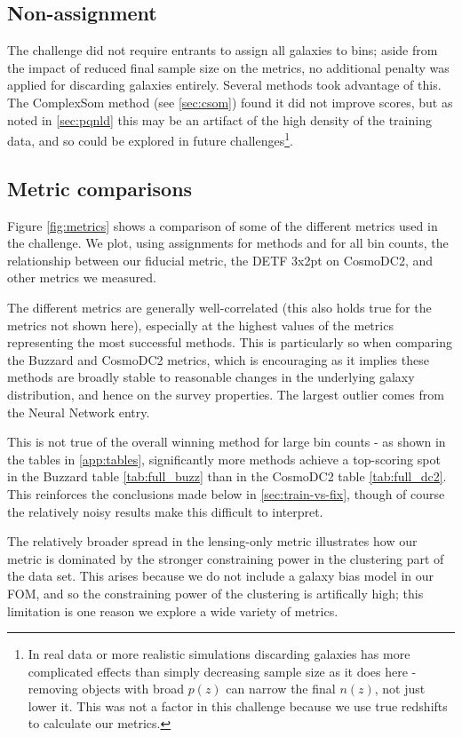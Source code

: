 \documentclass[twocolumn,twocolappendix]{aastex63}
\begin{document}
\subsection{Non-assignment}
The challenge did not require entrants to assign all galaxies to bins; aside from the impact of reduced final sample size on the metrics, no additional penalty was applied for discarding galaxies entirely.  Several methods
took advantage of this.  The ComplexSom method (see \autoref{sec:csom}) found
it did not improve scores, but as noted in \autoref{sec:pqnld} this may be an artifact
of the high density of the training data, and so could be explored in future challenges\footnote{In real data or more realistic simulations discarding galaxies has more complicated effects than simply decreasing sample size as it does here - removing objects with broad $p(z)$ can narrow the final $n(z)$, not just lower it. This was not a factor in this challenge because we use true redshifts to calculate our metrics.}.


\subsection{Metric comparisons} \label{sec:metric-results}
Figure \ref{fig:metrics} shows a comparison of some of the different metrics used in the challenge.
We plot, using assignments for methods and for all bin counts, the relationship between our fiducial
metric, the DETF 3x2pt on CosmoDC2, and other metrics we measured.

The different metrics are generally well-correlated (this also holds true for the metrics not 
shown here), especially at the highest values of the metrics representing the most successful
methods. This is particularly so when comparing the Buzzard and CosmoDC2 metrics, which is encouraging 
as it implies these methods are broadly stable to reasonable changes in the underlying galaxy
distribution, and hence on the survey properties.  The largest outlier comes from the 
{\sc Neural Network} entry.

This is not true of the overall winning method for large bin counts - as shown in the tables
in \autoref{app:tables}, significantly more methods achieve a top-scoring spot in the Buzzard
table \ref{tab:full_buzz} than in the CosmoDC2 table \ref{tab:full_dc2}. This reinforces the
conclusions made below in \autoref{sec:train-vs-fix}, though of course the relatively noisy
results make this difficult to interpret.

The relatively broader spread in the lensing-only metric illustrates how our metric is dominated
by the stronger constraining power in the clustering part of the data set.  This arises because
we do not include a galaxy bias model in our FOM, and so the constraining power of the clustering
is artifically high; this limitation is one reason we explore a wide variety of metrics.
\end{document}
